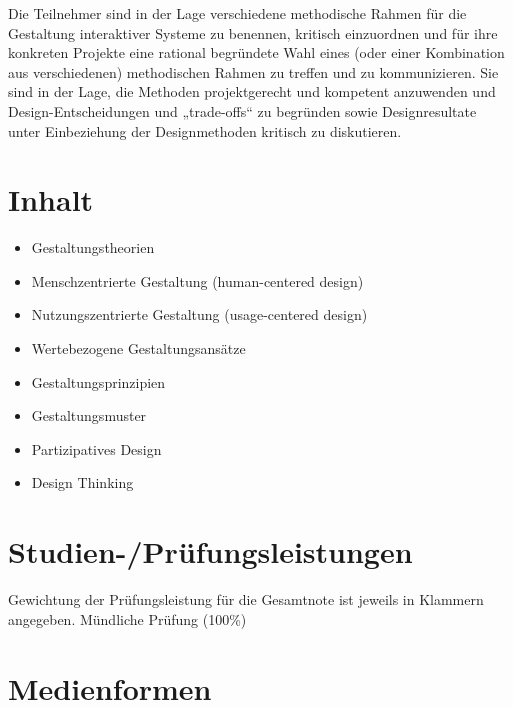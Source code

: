 Die Teilnehmer sind in der Lage verschiedene methodische Rahmen für die
Gestaltung interaktiver Systeme zu benennen, kritisch einzuordnen und
für ihre konkreten Projekte eine rational begründete Wahl eines (oder
einer Kombination aus verschiedenen) methodischen Rahmen zu treffen und
zu kommunizieren. Sie sind in der Lage, die Methoden projektgerecht und
kompetent anzuwenden und Design-Entscheidungen und „trade-offs`` zu
begründen sowie Designresultate unter Einbeziehung der Designmethoden
kritisch zu diskutieren.

\section*{Inhalt\label{/mi-2017/modulbeschreibungen-master/MA_HCI_Design_Methodologies}}\label{inhaltpathlabelmi-2017modulbeschreibungen-mastermaux5fhciux5fdesignux5fmethodologies}

\begin{itemize}
\tightlist
\item
  Gestaltungstheorien
\item
  Menschzentrierte Gestaltung (human-centered design)
\item
  Nutzungszentrierte Gestaltung (usage-centered design)
\item
  Wertebezogene Gestaltungsansätze
\item
  Gestaltungsprinzipien
\item
  Gestaltungsmuster
\item
  Partizipatives Design
\item
  Design Thinking
\end{itemize}

\section*{Studien-/Prüfungsleistungen\label{/mi-2017/modulbeschreibungen-master/MA_HCI_Design_Methodologies}}\label{studien-pruxfcfungsleistungenpathlabelmi-2017modulbeschreibungen-mastermaux5fhciux5fdesignux5fmethodologies}

Gewichtung der Prüfungsleistung für die Gesamtnote ist jeweils in
Klammern angegeben. Mündliche Prüfung (100\%)

\section*{Medienformen\label{/mi-2017/modulbeschreibungen-master/MA_HCI_Design_Methodologies}}\label{medienformenpathlabelmi-2017modulbeschreibungen-mastermaux5fhciux5fdesignux5fmethodologies}

